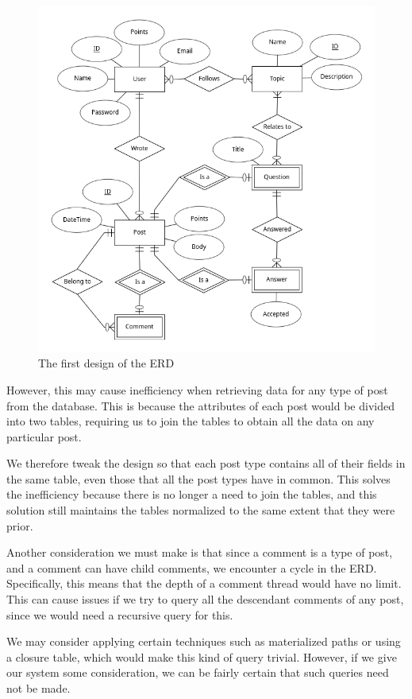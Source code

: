 \begin{figure}[p]
	\centering
	\includegraphics[width=\linewidth]{images/erd1.png}
	\caption{The first design of the ERD}
	\label{erd1}
\end{figure}

However, this may cause inefficiency when retrieving data for any type of post from the database. This is because the attributes of each post would be divided into two tables, requiring us to join the tables to obtain all the data on any particular post.

We therefore tweak the design so that each post type contains all of their fields in the same table, even those that all the post types have in common. This solves the inefficiency because there is no longer a need to join the tables, and this solution still maintains the tables normalized to the same extent that they were prior.

Another consideration we must make is that since a comment is a type of post, and a comment can have child comments, we encounter a cycle in the ERD. Specifically, this means that the depth of a comment thread would have no limit. This can cause issues if we try to query all the descendant comments of any post, since we would need a recursive query for this.

We may consider applying certain techniques such as materialized paths or using a closure table, which would make this kind of query trivial. However, if we give our system some consideration, we can be fairly certain that such queries need not be made.

